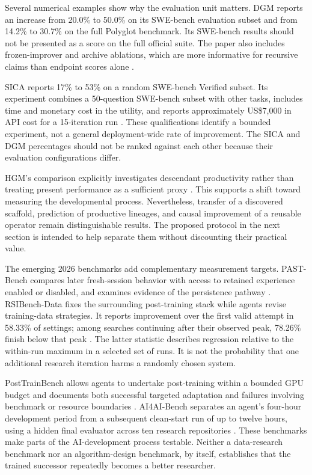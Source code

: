 \documentclass[11pt,american,]{article}
\begin{document}
Several numerical examples show why the evaluation unit matters. DGM
reports an increase from 20.0\% to 50.0\% on its SWE-bench evaluation
subset and from 14.2\% to 30.7\% on the full Polyglot benchmark. Its
SWE-bench results should not be presented as a score on the full
official suite. The paper also includes frozen-improver and archive
ablations, which are more informative for recursive claims than endpoint
scores alone \citep{dgm2025}.

SICA reports 17\% to 53\% on a random SWE-bench Verified subset. Its
experiment combines a 50-question SWE-bench subset with other tasks,
includes time and monetary cost in the utility, and reports
approximately US\$7,000 in API cost for a 15-iteration run
\citep{sica2025}. These qualifications identify a bounded experiment,
not a general deployment-wide rate of improvement. The SICA and DGM
percentages should not be ranked against each other because their
evaluation configurations differ.

HGM's comparison explicitly investigates descendant productivity rather
than treating present performance as a sufficient proxy \citep{hgm2025}.
This supports a shift toward measuring the developmental process.
Nevertheless, transfer of a discovered scaffold, prediction of
productive lineages, and causal improvement of a reusable operator
remain distinguishable results. The proposed protocol in the next
section is intended to help separate them without discounting their
practical value.

The emerging 2026 benchmarks add complementary measurement targets.
PAST-Bench compares later fresh-session behavior with access to retained
experience enabled or disabled, and examines evidence of the persistence
pathway \citep{pastbench2026}. RSIBench-Data fixes the surrounding
post-training stack while agents revise training-data strategies. It
reports improvement over the first valid attempt in 58.33\% of settings;
among searches continuing after their observed peak, 78.26\% finish
below that peak \citep{rsidata2026}. The latter statistic describes
regression relative to the within-run maximum in a selected set of runs.
It is not the probability that one additional research iteration harms a
randomly chosen system.

PostTrainBench allows agents to undertake post-training within a bounded
GPU budget and documents both successful targeted adaptation and
failures involving benchmark or resource boundaries
\citep{posttrain2026}. AI4AI-Bench separates an agent's four-hour
development period from a subsequent clean-start run of up to twelve
hours, using a hidden final evaluator across ten research repositories
\citep{ai4ai2026}. These benchmarks make parts of the AI-development
process testable. Neither a data-research benchmark nor an
algorithm-design benchmark, by itself, establishes that the trained
successor repeatedly becomes a better researcher.
\end{document}

